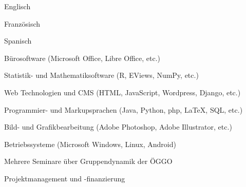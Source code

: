 


{\begin{cvenumerate}
		\item Englisch 
		\item Französisch 
		\item Spanisch 
	\end{cvenumerate}}

%

	{\begin{cvenumerate}
		\item Bürosoftware (Microsoft Office, Libre Office, etc.) 
		\item Statistik- und Mathematiksoftware (R, EViews, NumPy, etc.) 
		\item Web Technologien und CMS (HTML, JavaScript, Wordpress, Django, etc.) 
		\item Programmier- und Markupsprachen (Java, Python, php, LaTeX, SQL, etc.) 
		\item Bild- und Grafikbearbeitung (Adobe Photoshop, Adobe Illustrator, etc.) 
		\item Betriebssysteme (Microsoft Windows, Linux, Android) 
	\end{cvenumerate}}

	{\begin{cvenumerate}
		\item Mehrere Seminare über Gruppendynamik der ÖGGO
		\item Projektmanagement und -finanzierung
	\end{cvenumerate}}

